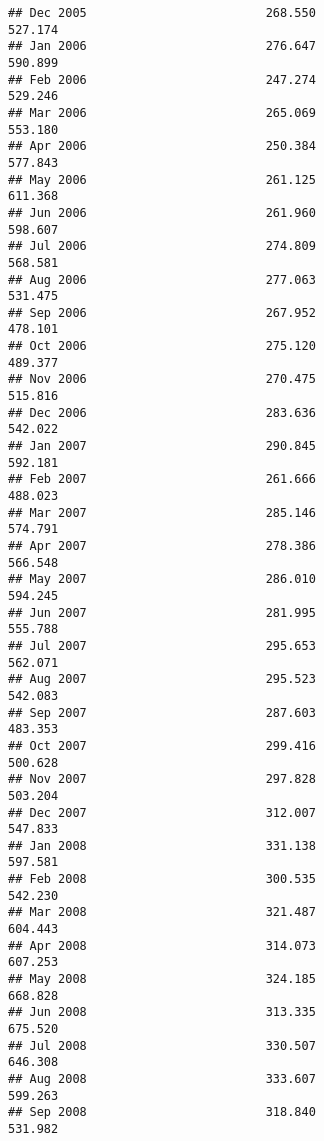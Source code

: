 \documentclass[
]{article}
\begin{document}
\begin{verbatim}
## Dec 2005                         268.550                           527.174
## Jan 2006                         276.647                           590.899
## Feb 2006                         247.274                           529.246
## Mar 2006                         265.069                           553.180
## Apr 2006                         250.384                           577.843
## May 2006                         261.125                           611.368
## Jun 2006                         261.960                           598.607
## Jul 2006                         274.809                           568.581
## Aug 2006                         277.063                           531.475
## Sep 2006                         267.952                           478.101
## Oct 2006                         275.120                           489.377
## Nov 2006                         270.475                           515.816
## Dec 2006                         283.636                           542.022
## Jan 2007                         290.845                           592.181
## Feb 2007                         261.666                           488.023
## Mar 2007                         285.146                           574.791
## Apr 2007                         278.386                           566.548
## May 2007                         286.010                           594.245
## Jun 2007                         281.995                           555.788
## Jul 2007                         295.653                           562.071
## Aug 2007                         295.523                           542.083
## Sep 2007                         287.603                           483.353
## Oct 2007                         299.416                           500.628
## Nov 2007                         297.828                           503.204
## Dec 2007                         312.007                           547.833
## Jan 2008                         331.138                           597.581
## Feb 2008                         300.535                           542.230
## Mar 2008                         321.487                           604.443
## Apr 2008                         314.073                           607.253
## May 2008                         324.185                           668.828
## Jun 2008                         313.335                           675.520
## Jul 2008                         330.507                           646.308
## Aug 2008                         333.607                           599.263
## Sep 2008                         318.840                           531.982

\end{verbatim}
\end{document}
